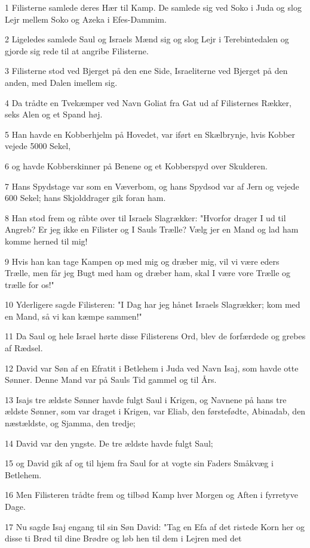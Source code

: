 \par 1 Filisterne samlede deres Hær til Kamp. De samlede sig ved Soko i Juda og slog Lejr mellem Soko og Azeka i Efes-Dammim.
\par 2 Ligeledes samlede Saul og Israels Mænd sig og slog Lejr i Terebintedalen og gjorde sig rede til at angribe Filisterne.
\par 3 Filisterne stod ved Bjerget på den ene Side, Israeliterne ved Bjerget på den anden, med Dalen imellem sig.
\par 4 Da trådte en Tvekæmper ved Navn Goliat fra Gat ud af Filisternes Rækker, seks Alen og et Spand høj.
\par 5 Han havde en Kobberhjelm på Hovedet, var iført en Skælbrynje, hvis Kobber vejede 5000 Sekel,
\par 6 og havde Kobberskinner på Benene og et Kobberspyd over Skulderen.
\par 7 Hans Spydstage var som en Væverbom, og hans Spydsod var af Jern og vejede 600 Sekel; hans Skjolddrager gik foran ham.
\par 8 Han stod frem og råbte over til Israels Slagrækker: "Hvorfor drager I ud til Angreb? Er jeg ikke en Filister og I Sauls Trælle? Vælg jer en Mand og lad ham komme herned til mig!
\par 9 Hvis han kan tage Kampen op med mig og dræber mig, vil vi være eders Trælle, men får jeg Bugt med ham og dræber ham, skal I være vore Trælle og trælle for os!"
\par 10 Yderligere sagde Filisteren: "I Dag har jeg hånet Israels Slagrækker; kom med en Mand, så vi kan kæmpe sammen!"
\par 11 Da Saul og hele Israel hørte disse Filisterens Ord, blev de forfærdede og grebes af Rædsel.
\par 12 David var Søn af en Efratit i Betlehem i Juda ved Navn Isaj, som havde otte Sønner. Denne Mand var på Sauls Tid gammel og til Års.
\par 13 Isajs tre ældste Sønner havde fulgt Saul i Krigen, og Navnene på hans tre ældste Sønner, som var draget i Krigen, var Eliab, den førstefødte, Abinadab, den næstældste, og Sjamma, den tredje;
\par 14 David var den yngste. De tre ældste havde fulgt Saul;
\par 15 og David gik af og til hjem fra Saul for at vogte sin Faders Småkvæg i Betlehem.
\par 16 Men Filisteren trådte frem og tilbød Kamp hver Morgen og Aften i fyrretyve Dage.
\par 17 Nu sagde Isaj engang til sin Søn David: "Tag en Efa af det ristede Korn her og disse ti Brød til dine Brødre og løb hen til dem i Lejren med det
